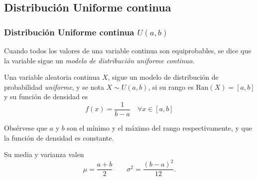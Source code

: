 \subsection{Distribución Uniforme continua}

\begin{frame}
\frametitle{Distribución Uniforme continua $U(a,b)$}
Cuando todos los valores de una variable continua son equiprobables, se dice que la variable sigue un \emph{modelo de distribución uniforme
continuo}.

\begin{definicion}
Una variable aleatoria continua $X$, sigue un modelo de distribución de probabilidad \emph{uniforme}, y se nota $X\sim U(a,b)$, si su rango es $\mbox{Ran}(X) = [a,b]$ y su función de densidad es 
\[
f(x)= \frac{1}{b-a}\quad \forall x\in [a,b]
\]
\end{definicion}

Obsérvese que $a$ y $b$ son el mínimo y el máximo del rango respectivamente, y que la función de densidad es constante.

Su media y varianza valen
\[
\mu = \frac{a+b}{2}\qquad \sigma^2=\frac{(b-a)^2}{12}.
\]

\end{frame}


